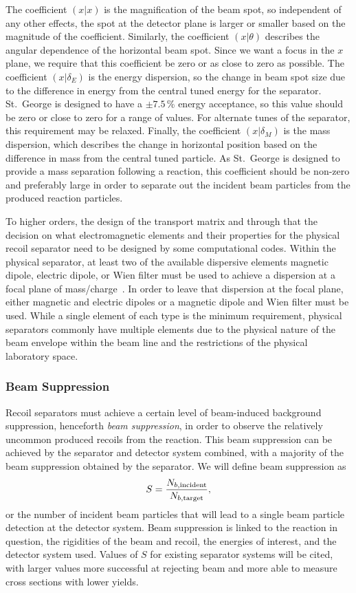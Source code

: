 The coefficient $(x|x)$ is the magnification of the beam spot, so
independent of any other effects, the spot at the detector plane is
larger or smaller based on the magnitude of the coefficient. Similarly,
the coefficient $(x|\theta)$ describes the angular dependence of the
horizontal beam spot. Since we want a focus in the $x$ plane, we
require that this coefficient be zero or as close to zero as possible.
The coefficient $(x|\delta_E)$ is the energy dispersion, so the change
in beam spot size due to the difference in energy from the central tuned
energy for the separator. St.\ George is designed to have a $\pm7.5$\,\%
energy acceptance, so this value should be zero or close to zero for a
range of values. For alternate tunes of the separator, this requirement
may be relaxed. Finally, the coefficient $(x|\delta_M)$ is the mass
dispersion, which describes the change in horizontal position based on
the difference in mass from the central tuned particle. As St.\ George
is designed to provide a mass separation following a reaction, this
coefficient should be non-zero and preferably large in order to
separate out the incident beam particles from the produced reaction
particles.

To higher orders, the design of the transport matrix and through that
the decision on what electromagnetic elements and their properties for
the physical recoil separator need to be designed by some computational
codes. Within the physical separator, at least two of the available
dispersive elements magnetic dipole, electric dipole, or Wien filter
must be used to achieve a dispersion at a focal plane of
mass/charge~\cite{Davids2003}. In order to leave that dispersion at the
focal plane, either magnetic and electric dipoles or a magnetic dipole
and Wien filter must be used. While a single element of each type is the
minimum requirement, physical separators commonly have multiple elements
due to the physical nature of the beam envelope within the beam line and
the restrictions of the physical laboratory space.

\subsubsection{Beam Suppression}
Recoil separators must achieve a certain level of beam-induced
background suppression, henceforth \emph{beam suppression}, in order to
observe the relatively uncommon produced recoils from the reaction. This
beam suppression can be achieved by the separator and detector system
combined, with a majority of the beam suppression obtained by the
separator. We will define beam suppression as
\[
    S = \frac{N_{b,\rm{incident}}}{N_{b,\rm{target}}},
\]
or the number of incident beam particles that will lead to a single beam
particle detection at the detector system. Beam suppression is linked to
the reaction in question, the rigidities of the beam and recoil, the
energies of interest, and the detector system used. Values of $S$ for
existing separator systems will be cited, with larger values more
successful at rejecting beam and more able to measure cross sections
with lower yields.

